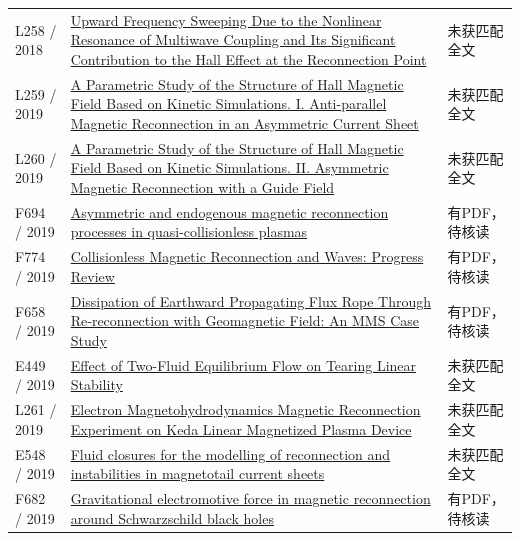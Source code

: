 \begin{longtable}{P{24mm}P{97mm}P{27mm}}
L258 / 2018 & \href{https://doi.org/10.1029/2018gl078614}{Upward Frequency Sweeping Due to the Nonlinear Resonance of Multiwave Coupling and Its Significant Contribution to the Hall Effect at the Reconnection Point} & 未获匹配全文\\

L259 / 2019 & \href{https://doi.org/10.3847/1538-4357/ab14ef}{A Parametric Study of the Structure of Hall Magnetic Field Based on Kinetic Simulations. I. Anti-parallel Magnetic Reconnection in an Asymmetric Current Sheet} & 未获匹配全文\\

L260 / 2019 & \href{https://doi.org/10.3847/1538-4357/ab35d9}{A Parametric Study of the Structure of Hall Magnetic Field Based on Kinetic Simulations. II. Asymmetric Magnetic Reconnection with a Guide Field} & 未获匹配全文\\

F694 / 2019 & \href{https://doi.org/10.1063/1.5086170}{Asymmetric and endogenous magnetic reconnection processes in quasi-collisionless plasmas} & 有PDF，待核读\\

F774 / 2019 & \href{https://doi.org/10.3389/fspas.2019.00070}{Collisionless Magnetic Reconnection and Waves: Progress Review} & 有PDF，待核读\\

F658 / 2019 & \href{https://doi.org/10.1029/2018ja026451}{Dissipation of Earthward Propagating Flux Rope Through Re‐reconnection with Geomagnetic Field: An MMS Case Study} & 有PDF，待核读\\

E449 / 2019 & \href{http://ui.adsabs.harvard.edu/abs/2019APS..DPPP10083G/abstract}{Effect of Two-Fluid Equilibrium Flow on Tearing Linear Stability} & 未获匹配全文\\

L261 / 2019 & \href{https://doi.org/10.1088/0256-307x/36/1/015201}{Electron Magnetohydrodynamics Magnetic Reconnection Experiment on Keda Linear Magnetized Plasma Device} & 未获匹配全文\\

E548 / 2019 & \href{https://dataspace.princeton.edu/handle/88435/dsp015d86p299f}{Fluid closures for the modelling of reconnection and instabilities in magnetotail current sheets} & 未获匹配全文\\

F682 / 2019 & \href{https://doi.org/10.1103/physrevd.99.063017}{Gravitational electromotive force in magnetic reconnection around Schwarzschild black holes} & 有PDF，待核读\\


\end{longtable}
